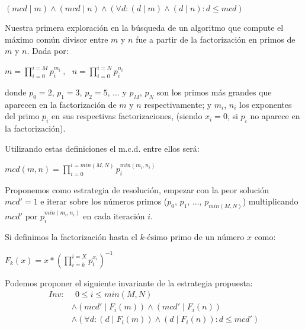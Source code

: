 \documentclass[12pt, a4paper, openany, fleqn]{book}
\begin{document}
    \begin{center}
        \begin{math}
            (mcd \mid m) \land (mcd \mid n) \land (\forall d: (d \mid m) \land (d \mid n) : d \leq mcd)
        \end{math}
    \end{center}

    Nuestra primera exploración en la búsqueda de un algoritmo que compute el máximo común divisor entre $m$ y $n$ fue a partir de la factorización en primos de $m$ y $n$. Dada por:

    \begin{center}
        \begin{math}
            m = \prod_{i=0}^{i=M} p_{i}^{m_i}\ , \ \ \ n = \prod_{i=0}^{i=N} p_{i}^{n_i}
        \end{math}
    \end{center}

    donde $p_0=2$, $p_1= 3$, $p_2= 5$, ... y $p_{M}$, $p_{N}$ son los primos más grandes que aparecen en la factorización de $m$ y $n$ respectivamente; y $m_i$, $n_i$ los exponentes del primo $p_i$ en sus respectivas factorizaciones, (siendo $x_i=0$, si $p_i$ no aparece en la factorización).

    Utilizando estas definiciones el m.c.d. entre ellos será:

    \begin{center}
        \begin{math}
            mcd(m, n) = \prod_{i=0}^{i=min(M, N)} p_{i}^{min(m_i, n_i)}
        \end{math}
    \end{center}

    Proponemos como estrategia de resolución, empezar con la peor solución $mcd' = 1$ e iterar sobre los números primos ($p_0$, $p_1$, ..., $p_{min(M, N)}$) multiplicando $mcd'$ por $p_{i}^{min(m_{i}, n_{i})}$ en cada iteración $i$.

    Si definimos la factorización hasta el $k$-ésimo primo de un número $x$ como:
    \begin{center}
        \begin{math}
            F_k(x) = x * (\prod_{i=k}^{i=X} p_{i}^{x_i})^{-1}
        \end{math}
    \end{center}

    Podemos proponer el siguiente invariante de la estrategia propuesta:
    \begin{align*}
        Inv:&\ \  0 \leqslant i \leqslant min(M, N) \\
            &\land (mcd' \mathrel{|} F_i(m)) \land (mcd' \mathrel{|} F_i(n)) \\
            &\land (\forall d: (d \mathrel{|} F_i(m)) \land (d \mathrel{|} F_i(n)) : d \leq mcd') 
    \end{align*}
\end{document}

